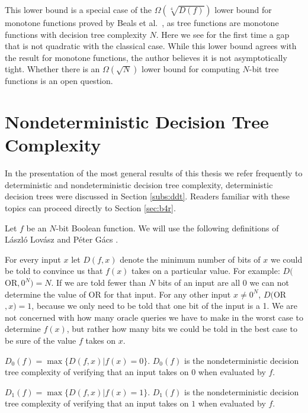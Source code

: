This lower bound is a special case of the $\Omega(\sqrt[4]{D(f)})$
lower bound for monotone functions proved by Beals et al.\
\cite{beals98quantum}, as tree functions are monotone functions with
decision tree complexity $N$.  Here we see for the first time a gap
that is not quadratic with the classical case.  While this lower bound
agrees with the result for monotone functions, the author believes it
is not asymptotically tight.  Whether there is an $\Omega(\sqrt{N})$
lower bound for computing $N$-bit tree functions is an open question.

\section{Nondeterministic Decision Tree Complexity}
\label{sec:dndtc}

In the presentation of the most general results of this thesis we
refer frequently to deterministic and nondeterministic decision tree
complexity, deterministic decision trees were discussed in Section
\ref{subs:ddt}.  Readers familiar with these topics can proceed
directly to Section \ref{sec:b4r}.

Let $f$ be an $N$-bit Boolean function.  We will use the following
definitions of L{\'{a}}szl{\'{o}} Lov{\'{a}}sz and P{\'{e}}ter
G{\'{a}}cs \cite{lovasz94complexity}.

For every input $x$ let $D(f,x)$ denote the minimum number of bits of
$x$ we could be told to convince us that $f(x)$ takes on a particular
value.  For example: $D($OR$,0^{N}) = N$.  If we are told fewer than
$N$ bits of an input are all 0 we can not determine the value of OR
for that input.  For any other input $x \neq 0^{N}$, $D($OR$,x) = 1$,
because we only need to be told that one bit of the input is a 1.  We
are not concerned with how many oracle queries we have to make in the
worst case to determine $f(x)$, but rather how many bits we could be
told in the best case to be sure of the value $f$ takes on $x$.

\begin{defi}
\label{defi:nd0}
$D_{0}(f) = \max\{D(f,x) | f(x) = 0\}$.  $D_{0}(f)$ is the
nondeterministic decision tree complexity of verifying that an input
takes on $0$ when evaluated by $f$.
\end{defi}

\begin{defi}
\label{defi:nd1}
$D_{1}(f) = \max\{D(f,x) | f(x) = 1\}$.  $D_{1}(f)$ is the
nondeterministic decision tree complexity of verifying that an input
takes on $1$ when evaluated by $f$.
\end{defi}

